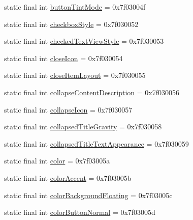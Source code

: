 \begin{DoxyCompactItemize}
\item 
static final int \mbox{\hyperlink{classandroid_1_1support_1_1design_1_1_r_1_1attr_a47b2fd06b59f201a643295986397e47a}{button\+Tint\+Mode}} = 0x7f03004f
\item 
static final int \mbox{\hyperlink{classandroid_1_1support_1_1design_1_1_r_1_1attr_abac68647b3bf87f91a6a8797daa07430}{checkbox\+Style}} = 0x7f030052
\item 
static final int \mbox{\hyperlink{classandroid_1_1support_1_1design_1_1_r_1_1attr_a46619b29955b955344296891b92bfc16}{checked\+Text\+View\+Style}} = 0x7f030053
\item 
static final int \mbox{\hyperlink{classandroid_1_1support_1_1design_1_1_r_1_1attr_ab8fd66b58592da0068302a1f8a189f7c}{close\+Icon}} = 0x7f030054
\item 
static final int \mbox{\hyperlink{classandroid_1_1support_1_1design_1_1_r_1_1attr_afe89b1d611a683ea18f85ffdb515f2e0}{close\+Item\+Layout}} = 0x7f030055
\item 
static final int \mbox{\hyperlink{classandroid_1_1support_1_1design_1_1_r_1_1attr_a215609776fda25e73da2d429d4e8310f}{collapse\+Content\+Description}} = 0x7f030056
\item 
static final int \mbox{\hyperlink{classandroid_1_1support_1_1design_1_1_r_1_1attr_a8f6c4abc219435477139c0be490cc35c}{collapse\+Icon}} = 0x7f030057
\item 
static final int \mbox{\hyperlink{classandroid_1_1support_1_1design_1_1_r_1_1attr_a2f6e7d8594fc1d351255f9c547a25e5e}{collapsed\+Title\+Gravity}} = 0x7f030058
\item 
static final int \mbox{\hyperlink{classandroid_1_1support_1_1design_1_1_r_1_1attr_a4d0eb85ec9562313f00d4af6c9ed6b73}{collapsed\+Title\+Text\+Appearance}} = 0x7f030059
\item 
static final int \mbox{\hyperlink{classandroid_1_1support_1_1design_1_1_r_1_1attr_ab11a93bf8eba02b9dcc4fd0f690cbc73}{color}} = 0x7f03005a
\item 
static final int \mbox{\hyperlink{classandroid_1_1support_1_1design_1_1_r_1_1attr_a15e1522787f101529fbfb34e6839a47e}{color\+Accent}} = 0x7f03005b
\item 
static final int \mbox{\hyperlink{classandroid_1_1support_1_1design_1_1_r_1_1attr_a1015287b07505c4a3bfd0b74f81c26ad}{color\+Background\+Floating}} = 0x7f03005c
\item 
static final int \mbox{\hyperlink{classandroid_1_1support_1_1design_1_1_r_1_1attr_af13a0f02cf3973a6702c3aed33502dca}{color\+Button\+Normal}} = 0x7f03005d
\item 

\end{DoxyCompactItemize}
